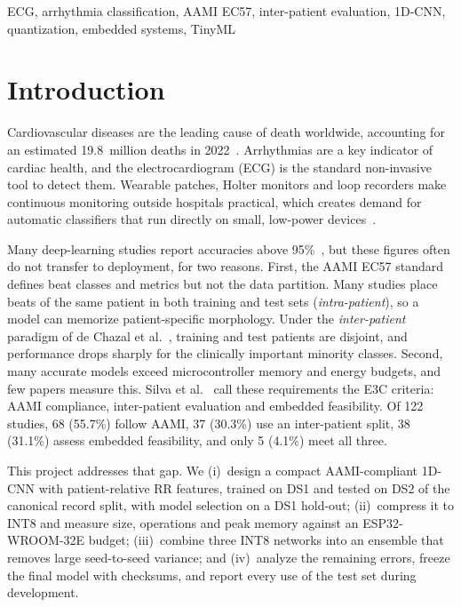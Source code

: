 \documentclass[conference]{IEEEtran}
\begin{document}
\begin{IEEEkeywords}
ECG, arrhythmia classification, AAMI EC57, inter-patient evaluation, 1D-CNN, quantization, embedded systems, TinyML
\end{IEEEkeywords}

\section{Introduction}
Cardiovascular diseases are the leading cause of death worldwide, accounting for an estimated 19.8~million deaths in 2022~\cite{who2025cvd}. Arrhythmias are a key indicator of cardiac health, and the electrocardiogram (ECG) is the standard non-invasive tool to detect them. Wearable patches, Holter monitors and loop recorders make continuous monitoring outside hospitals practical, which creates demand for automatic classifiers that run directly on small, low-power devices~\cite{silva2026review,demeloribeiro2022quantized,busia2025tiny}.

Many deep-learning studies report accuracies above 95\%~\cite{xiao2023review}, but these figures often do not transfer to deployment, for two reasons. First, the AAMI EC57 standard~\cite{aami2012ec57} defines beat classes and metrics but not the data partition. Many studies place beats of the same patient in both training and test sets (\emph{intra-patient}), so a model can memorize patient-specific morphology. Under the \emph{inter-patient} paradigm of de Chazal et al.~\cite{dechazal2004automatic}, training and test patients are disjoint, and performance drops sharply for the clinically important minority classes. Second, many accurate models exceed microcontroller memory and energy budgets, and few papers measure this. Silva et al.~\cite{silva2026review} call these requirements the E3C criteria: AAMI compliance, inter-patient evaluation and embedded feasibility. Of 122 studies, 68 (55.7\%) follow AAMI, 37 (30.3\%) use an inter-patient split, 38 (31.1\%) assess embedded feasibility, and only 5 (4.1\%) meet all three.

This project addresses that gap. We (i)~design a compact AAMI-compliant 1D-CNN with patient-relative RR features, trained on DS1 and tested on DS2 of the canonical record split, with model selection on a DS1 hold-out; (ii)~compress it to INT8 and measure size, operations and peak memory against an ESP32-WROOM-32E budget; (iii)~combine three INT8 networks into an ensemble that removes large seed-to-seed variance; and (iv)~analyze the remaining errors, freeze the final model with checksums, and report every use of the test set during development.
\end{document}
